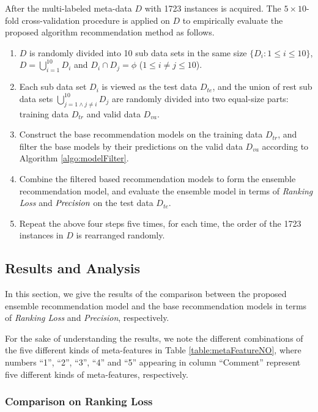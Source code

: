 \documentclass[prodmode,acmtkdd]{acmsmall}
\begin{document}
After the multi-labeled meta-data $D$ with 1723 instances is
acquired. The $5\times 10$-fold cross-validation procedure is
applied on $D$ to empirically evaluate the proposed algorithm
recommendation method as follows.
\begin{enumerate}
    \item $D$ is randomly divided into 10 sub data sets in the
    same size $\{D_{i}: 1\leq i\leq 10\}$, $D = \bigcup_{i=1}^{10} D_{i}$ and
    $D_{i}\cap D_{j} = \phi$ ($1\leq i\neq j\leq 10$).
    \item Each sub data set $D_{i}$ is viewed as the test data
    $D_{te}$, and the union of rest sub data sets $\bigcup_{j=1\wedge j\neq i}^{10} D_{j}$
    are randomly divided into two equal-size parts: training data $D_{tr}$ and
    valid data $D_{va}$.
    \item Construct the base recommendation models on the training
    data $D_{tr}$, and filter the base models by their predictions
    on the valid data $D_{va}$ according to Algorithm
    \ref{algo:modelFilter}.
    \item Combine the filtered based recommendation models to form
    the ensemble recommendation model, and evaluate the ensemble
    model in terms of \emph{Ranking Loss} and $\emph{Precision}$ on
    the test data $D_{te}$.
    \item Repeat the above four steps five times, for each time, the
    order of the 1723 instances in $D$ is rearranged randomly.
\end{enumerate}


\subsection{Results and Analysis}\label{subsec:result}

In this section, we give the results of the comparison between the
proposed ensemble recommendation model and the base recommendation
models in terms of \emph{Ranking Loss}  and \emph{Precision},
respectively.

For the sake of understanding the results, we note the different
combinations of the five different kinds of meta-features in Table
\ref{table:metaFeatureNO}, where numbers ``1'', ``2'', ``3'', ``4''
and ``5'' appearing in column ``Comment'' represent five different
kinds of meta-features, respectively.

\subsubsection{Comparison on Ranking Loss}
\end{document}
